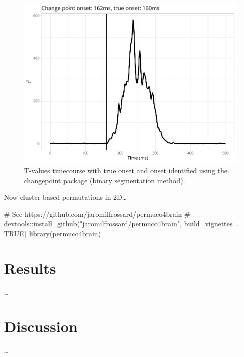 \documentclass[
  doc,
  floatsintext,
  longtable,
  a4paper,
  nolmodern,
  notxfonts,
  notimes,
  colorlinks=true,linkcolor=blue,citecolor=blue,urlcolor=blue]{apa7}
\newenvironment{Shaded}{\begin{snugshade}}{\end{snugshade}}
\newcommand{\CommentTok}[1]{\textcolor[rgb]{0.37,0.37,0.37}{#1}}
\newcommand{\FunctionTok}[1]{\textcolor[rgb]{0.28,0.35,0.67}{#1}}
\newcommand{\NormalTok}[1]{\textcolor[rgb]{0.00,0.23,0.31}{#1}}
\begin{document}
\begin{figure}[H]

\caption{T-values timecourse with true onset and onset identified using
the changepoint package (binary segmentation method).}

{\centering \includegraphics[width=1\textwidth,height=\textheight]{brms_meeg_files/figure-pdf/changepoint-1.pdf}

}

\end{figure}%

Now cluster-based permutations in 2D\ldots{}

\begin{Shaded}
\begin{Highlighting}[]
\CommentTok{\# See https://github.com/jaromilfrossard/permuco4brain}
\CommentTok{\# devtools::install\_github("jaromilfrossard/permuco4brain", build\_vignettes = TRUE)}
\FunctionTok{library}\NormalTok{(permuco4brain)}
\end{Highlighting}
\end{Shaded}

\section{Results}\label{results}

\ldots{}

\section{Discussion}\label{discussion}

\ldots{}
\end{document}
